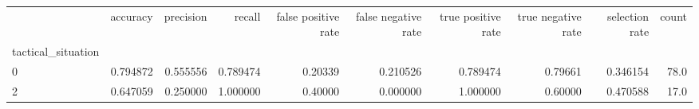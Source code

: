 \begin{tabular}{lrrrrrrrrr}
\toprule
{} &  accuracy &  precision &    recall &  false positive rate &  false negative rate &  true positive rate &  true negative rate &  selection rate &  count \\
tactical\_situation &           &            &           &                      &                      &                     &                     &                 &        \\
\midrule
0                  &  0.794872 &   0.555556 &  0.789474 &              0.20339 &             0.210526 &            0.789474 &             0.79661 &        0.346154 &   78.0 \\
2                  &  0.647059 &   0.250000 &  1.000000 &              0.40000 &             0.000000 &            1.000000 &             0.60000 &        0.470588 &   17.0 \\
\bottomrule
\end{tabular}
